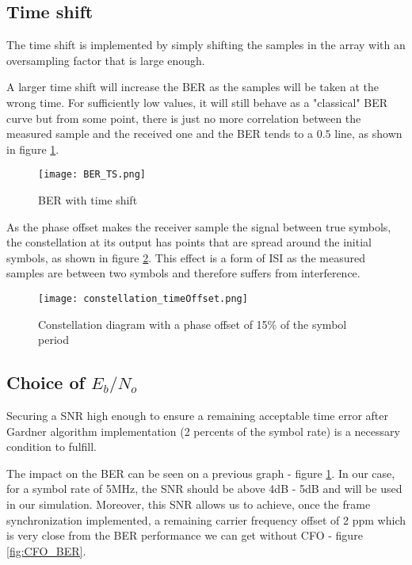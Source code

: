\subsection{Time shift}
The time shift is implemented by simply shifting the samples in the array with an oversampling factor that is large enough. \par
A larger time shift will increase the BER as the samples will be taken at the wrong time. For sufficiently low values, it will still behave as a "classical" BER curve but from some point, there is just no more correlation between the measured sample and the received one and the BER tends to a $0.5$ line, as shown in figure \ref{fig:BER_TS}. \par

\begin{figure}[H]
    \centering
    \texttt{[image: BER\_TS.png]}
    \caption{BER with time shift}
    \label{fig:BER_TS}
\end{figure}

As the phase offset makes the receiver sample the signal between true symbols, the constellation at its output has points that are spread around the initial symbols, as shown in figure \ref{fig:phaseShiftConst}. This effect is a form of ISI as the measured samples are between two symbols and therefore suffers from interference.

\begin{figure}[H]
    \centering
    \texttt{[image: constellation\_timeOffset.png]}
    \caption{Constellation diagram with a phase offset of 15\% of the symbol period}
    \label{fig:phaseShiftConst}
\end{figure}

\subsection{Choice of $E_{b}/N_{o}$}
Securing a SNR high enough to ensure a remaining acceptable time error after Gardner algorithm implementation
 (2 percents of the symbol rate) is a necessary condition to fulfill.\par
The impact on the BER can be seen on a previous graph - figure \ref{fig:BER_TS}.
In our case, for a symbol rate of 5MHz, the SNR should be above 4dB - 5dB and will be used in our simulation.
Moreover, this SNR allows us to achieve, once the frame synchronization implemented, a remaining carrier frequency offset
of 2 ppm which is very close from the BER performance we can get without CFO - figure \ref{fig:CFO_BER}.


